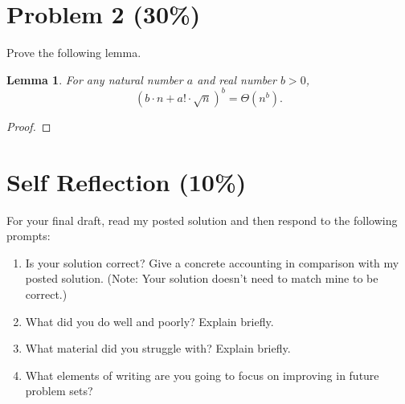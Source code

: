 \documentclass[11pt]{article}
\newtheorem{lemma}[theorem]{Lemma}
\theoremstyle{nonumberplain}
\newtheorem{proof}{Proof}
\begin{document}
\section*{Problem 2 (30\%)}

Prove the following lemma.

\begin{lemma}
For any natural number $a$ and real number $b > 0$,
$$(b \cdot n + a! \cdot \sqrt{n})^b = \Theta(n^b).$$
\end{lemma}

\begin{proof}

\end{proof}



\section*{Self Reflection (10\%)}

For your final draft, read my posted solution and then respond to the following prompts:
\begin{enumerate}

\item Is your solution correct?  Give a concrete accounting in
  comparison with my posted solution.  (Note: Your solution doesn't
  need to match mine to be correct.)
\item What did you do well and poorly? Explain briefly.
\item What material did you struggle with? Explain briefly.
\item What elements of writing are you going to focus on improving in future problem sets?
  
\end{enumerate}

\end{document}
